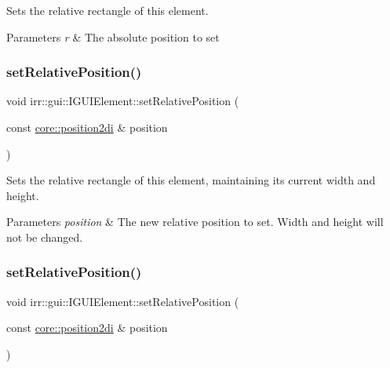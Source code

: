 Sets the relative rectangle of this element. 


\begin{DoxyParams}{Parameters}
{\em r} & The absolute position to set \\
\hline
\end{DoxyParams}
\mbox{\label{classirr_1_1gui_1_1IGUIElement_aba1cfc75daa28e53a021faa2d954b79b}} 
\subsubsection{\texorpdfstring{set\+Relative\+Position()}{setRelativePosition()}\hspace{0.1cm}{\footnotesize\ttfamily [3/4]}}
{\footnotesize\ttfamily void irr\+::gui\+::\+I\+G\+U\+I\+Element\+::set\+Relative\+Position (\begin{DoxyParamCaption}\item[{const \hyperlink{namespaceirr_1_1core_ace0f1379db5f9f5660456ec57ab78202}{core\+::position2di} \&}]{position }\end{DoxyParamCaption})\hspace{0.3cm}{\ttfamily [inline]}}



Sets the relative rectangle of this element, maintaining its current width and height. 


\begin{DoxyParams}{Parameters}
{\em position} & The new relative position to set. Width and height will not be changed. \\
\hline
\end{DoxyParams}
\mbox{\label{classirr_1_1gui_1_1IGUIElement_aba1cfc75daa28e53a021faa2d954b79b}} 
\subsubsection{\texorpdfstring{set\+Relative\+Position()}{setRelativePosition()}\hspace{0.1cm}{\footnotesize\ttfamily [4/4]}}
{\footnotesize\ttfamily void irr\+::gui\+::\+I\+G\+U\+I\+Element\+::set\+Relative\+Position (\begin{DoxyParamCaption}\item[{const \hyperlink{namespaceirr_1_1core_ace0f1379db5f9f5660456ec57ab78202}{core\+::position2di} \&}]{position }\end{DoxyParamCaption})\hspace{0.3cm}{\ttfamily [inline]}}



